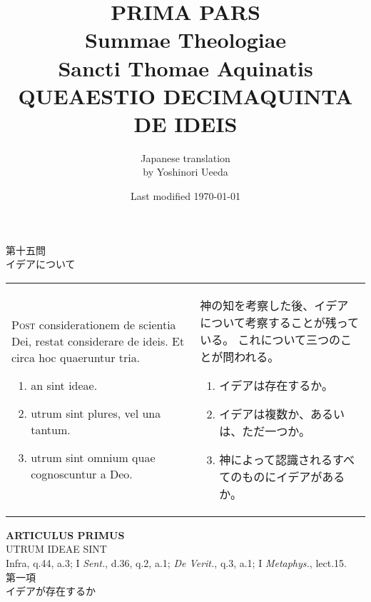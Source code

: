 \documentclass[10pt]{jsarticle} %
\title{{\bf PRIMA PARS}\\{\HUGE Summae Theologiae}\\Sancti Thomae
Aquinatis\\{\sffamily QUEAESTIO DECIMAQUINTA}\\DE IDEIS}
\author{Japanese translation\\by Yoshinori {\sc Ueeda}}
\date{Last modified \today}
\begin{document}
\maketitle
\pagestyle{fancy}

\begin{center}
{\Large 第十五問\\イデアについて}
\end{center}

\begin{longtable}{p{21em}p{21em}}
{\huge P}{\scshape ost} considerationem de scientia Dei, restat
 considerare de ideis. Et circa hoc quaeruntur tria. 

\begin{enumerate}
 \item an sint ideae.
 \item utrum sint plures, vel una tantum.
 \item utrum sint omnium quae cognoscuntur a Deo.
\end{enumerate}

&

神の知を考察した後、イデアについて考察することが残っている。
これについて三つのことが問われる。

\begin{enumerate}
 \item イデアは存在するか。
 \item イデアは複数か、あるいは、ただ一つか。
 \item 神によって認識されるすべてのものにイデアがあるか。
\end{enumerate}

\end{longtable}

\newpage

\begin{center}
 {\Large {\bf ARTICULUS PRIMUS}}\\
 {\large UTRUM IDEAE SINT}\\
 {\footnotesize Infra, q.44, a.3; I {\itshape Sent.}, d.36, q.2,
 a.1; {\itshape De Verit.}, q.3, a.1; I {\itshape Metaphys.}, lect.15.}\\
 {\Large 第一項\\イデアが存在するか}
\end{center}
\end{document}
